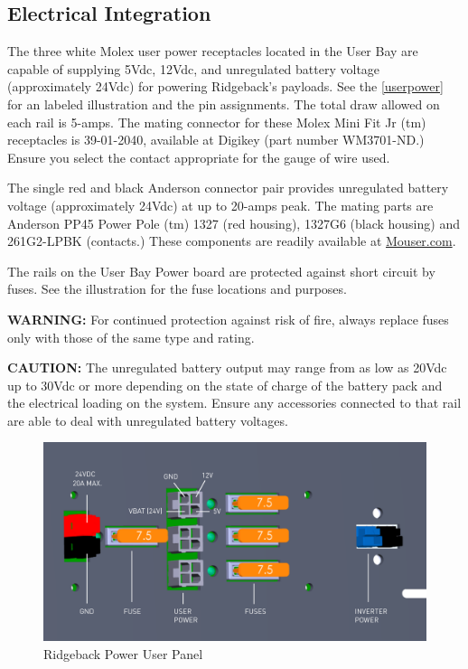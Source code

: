 \documentclass[]{clearpath-latex/clearpath-manual}
\begin{document}
\subsection{Electrical Integration}
\label{electrical}

The three white Molex user power receptacles located in the User Bay are capable of supplying 5Vdc, 12Vdc, and unregulated battery voltage (approximately 24Vdc) for powering Ridgeback's payloads. See the \autoref{userpower} for an labeled illustration and the pin assignments. The total draw allowed on each rail is 5-amps. The mating connector for these Molex Mini Fit Jr (tm) receptacles is 39-01-2040, available at Digikey (part number WM3701-ND.) Ensure you select the contact appropriate for the gauge of wire used.

The single red and black Anderson connector pair provides unregulated battery voltage (approximately 24Vdc) at up to 20-amps peak. The mating parts are Anderson PP45 Power Pole (tm) 1327 (red housing), 1327G6 (black housing) and 261G2-LPBK (contacts.) These components are readily available at \url{Mouser.com}.

The rails on the User Bay Power board are protected against short circuit by fuses. See the illustration for the fuse locations and purposes.

\textbf{WARNING:} For continued protection against risk of fire, always replace fuses only with those of the same type and rating.

\textbf{CAUTION:} The unregulated battery output may range from as low as 20Vdc up to 30Vdc or more depending on the state of charge of the battery pack and the electrical loading on the system. Ensure any accessories connected to that rail are able to deal with unregulated battery voltages.



\begin{figure}[h]
  \centering
  \includegraphics[width=1.0\linewidth]{Ridgeback_UserPower_SOLID.pdf}
  \caption{Ridgeback Power User Panel}
  \label{userpower}
\end{figure}
\end{document}
